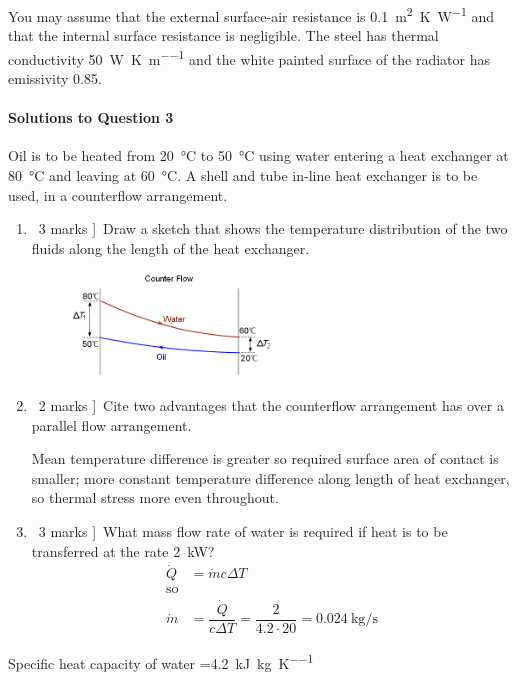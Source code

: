 \documentclass[a4paper,12pt,fleqn]{article}
\begin{document}
You may assume that the external surface-air resistance is \SI{0.1} {\metre\squared\kelvin\per\watt} and that the internal surface resistance is negligible. The steel has thermal conductivity \SI{50}{\watt\per\kelvin\per\metre} and the white painted surface of the radiator has emissivity 0.85.

\bigskip
\paragraph{\textbf{Solutions to Question 3} \ }
Oil is to be heated from \SI{20}{\celsius} to \SI{50}{\celsius} using water entering a heat exchanger at \SI{80}{\celsius} and leaving at \SI{60}{\celsius}. A shell and tube in-line heat exchanger is to be used, in a counterflow arrangement. 
\begin{enumerate}[label=\alph*)]
\item \lbrack\ 3 marks ]\ Draw a sketch that shows the temperature distribution of the two fluids along the length of the heat exchanger.\\
\begin{figure}[h]
\centering
\includegraphics[width=0.5\textwidth]{./figures/CounterFlowHeatExchanger}
\end{figure}
\item \lbrack\ 2 marks ]\ Cite two advantages that the counterflow arrangement has over a parallel flow arrangement.\par
Mean temperature difference is greater so required surface area of contact is smaller; more constant temperature difference along length of heat exchanger, so thermal stress more even throughout.
\item \lbrack\ 3 marks ]\ What mass flow rate of water is required if heat is to be transferred at the rate \SI{2}{\kilo\watt}?
\begin{align*}
\dot Q&=\dot m c\Delta T\\
\mathrm{so}\\
\dot m &= \dfrac{\dot Q}{c\Delta T}=\dfrac{2}{4.2\cdot 20}=\SI{0.024}{\kg\per\second}
\end{align*}
\end{enumerate}
Specific heat capacity of water =\SI{4.2}{\kilo\joule\per\kg\per\kelvin}
\end{document}
